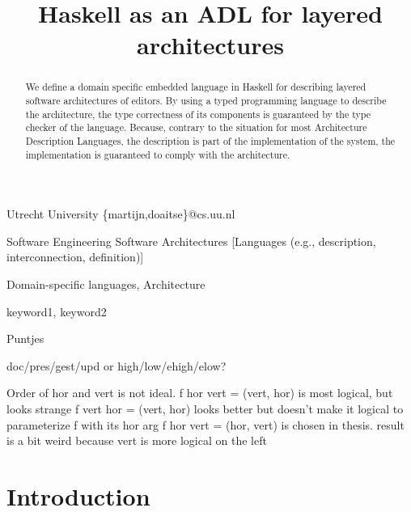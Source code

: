 \documentclass[preprint,natbib]{sigplanconf}
\begin{document}
\copyrightdata{[to be supplied]} 

\preprintfooter{\version}   %

\title{Haskell as an ADL for layered architectures}

           {Utrecht University}
           {\{martijn,doaitse\}@cs.uu.nl}

\maketitle

\begin{abstract}
We define a domain specific embedded language in Haskell for describing
layered software architectures of editors. By using a typed programming
language to describe the architecture, the type correctness of its components
is guaranteed by the type checker of the language. Because, contrary to the situation for most Architecture Description Languages, the
description is part of the implementation of the
system, the implementation is guaranteed to comply with the architecture.
\end{abstract}

 {Software Engineering}
                  {Software Architectures}
                  [Languages (e.g., description, interconnection, definition)]

\terms
Domain-specific languages, Architecture

\keywords
keyword1, keyword2 



\bc
Puntjes

doc/pres/gest/upd or high/low/ehigh/elow?


Order of hor and vert is not ideal.  
f hor vert = (vert, hor) is most logical, but looks strange
f vert hor = (vert, hor) looks better but doesn't make it logical to parameterize f with its hor arg
f hor vert = (hor, vert) is chosen in thesis. result is a bit weird because vert is more logical on the left

\ec

\section{Introduction}\label{sect:introduction}
\end{document}
